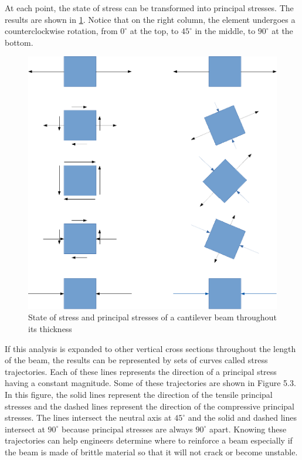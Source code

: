 \documentclass[
10pt,
a4paper,
openany,
svgnames,
]{book}
\begin{document}
At each point, the state of stress can be transformed into principal stresses. The results are shown in \cref{fig: stress traject in beam}. Notice that on the right column, the element undergoes a counterclockwise rotation, from $0^{\circ}$ at the top, to $45^{\circ}$ in the middle, to $90^{\circ}$ at the bottom.

\begin{figure}[h]
  \centering
  \includegraphics[scale=.6]{pictures/Simple-load-bearing/stress-traject-beam}
  \caption{State of stress and principal stresses of a cantilever beam throughout its thickness}
  \label{fig: stress traject in beam}
\end{figure}

If this analysis is expanded to other vertical cross sections throughout the length of the beam, the results can be represented by sets of curves called stress trajectories. Each of these lines represents the direction of a principal stress having a constant magnitude. Some of these trajectories are shown in Figure 5.3. In this figure, the solid lines represent the direction of the tensile principal stresses and the dashed lines represent the direction of the compressive principal stresses. The lines intersect the neutral axis at $45^{\circ}$ and the solid and dashed lines intersect at $90^{\circ}$ because principal stresses are always $90^{\circ}$ apart. Knowing these trajectories can help engineers determine where to reinforce a beam especially if the beam is made of brittle material so that it will not crack or become unstable.
\end{document}
